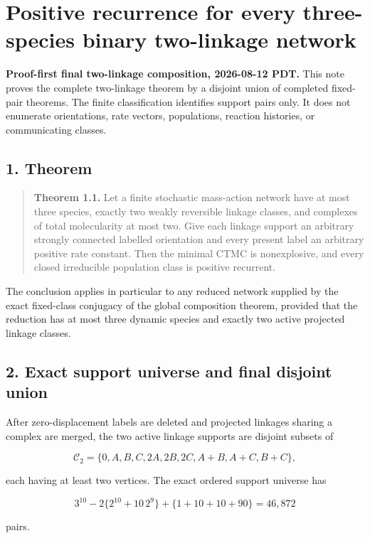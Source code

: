 \section{Positive recurrence for every three-species binary two-linkage
network}

\textbf{Proof-first final two-linkage composition, 2026-08-12 PDT.} This
note proves the complete two-linkage theorem by a disjoint union of
completed fixed-pair theorems. The finite classification identifies
support pairs only. It does not enumerate orientations, rate vectors,
populations, reaction histories, or communicating classes.

\subsection{1. Theorem}

\begin{quote}
\textbf{Theorem 1.1.} Let a finite stochastic mass-action network have
at most three species, exactly two weakly reversible linkage classes,
and complexes of total molecularity at most two. Give each linkage
support an arbitrary strongly connected labelled orientation and every
present label an arbitrary positive rate constant. Then the minimal CTMC
is nonexplosive, and every closed irreducible population class is
positive recurrent.
\end{quote}

The conclusion applies in particular to any reduced network supplied by
the exact fixed-class conjugacy of the global composition theorem,
provided that the reduction has at most three dynamic species and
exactly two active projected linkage classes.

\subsection{2. Exact support universe and final disjoint
union}

After zero-displacement labels are deleted and projected linkages
sharing a complex are merged, the two active linkage supports are
disjoint subsets of

\[
 \mathcal C_2=\{0,A,B,C,2A,2B,2C,A+B,A+C,B+C\},       \tag{2.1}
\]

each having at least two vertices. The exact ordered support universe
has

\[
 3^{10}-2\{2^{10}+10\,2^9\}+\{1+10+10+90\}=46{,}872 \tag{2.2}
\]

pairs.

